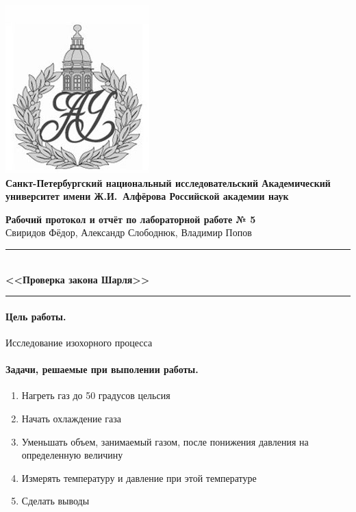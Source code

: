 \documentclass{article}
\begin{document}
	\begin{center}
		\includegraphics[scale=0.25]{AU}\\
		{\Large\bfseries Санкт-Петербургский национальный исследовательский Академический университет имени Ж.И.~Алфёрова Российской академии наук}
	\end{center}
	
	\begin{center}
		{\large\textbf{Рабочий протокол и отчёт по лабораторной работе № 5}}\\
		Свиридов Фёдор, Александр Слободнюк, Владимир Попов
	\end{center}
	
	\begin{center}
		\rule{12cm}{0.4mm}\\
		\large\bfseries{<<Проверка закона Шарля>>}\\
		\rule{12cm}{0.4mm}
	\end{center}
	\paragraph{Цель работы.} Исследование изохорного процесса
	\paragraph{Задачи, решаемые при выполении работы.}
	\begin{enumerate}
		\item Нагреть газ до 50 градусов цельсия
		\item Начать охлаждение газа
		\item Уменьшать объем, занимаемый газом, после понижения давления на определенную величину
		\item Измерять температуру и давление при этой температуре
		\item Сделать выводы
	\end{enumerate}
\end{document}
